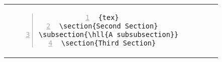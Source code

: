 \begin{table}[h!]
\begin{tabular}{c | c}
\begin{minipage}[m]{0.55\textwidth}
\begin{lstlisting}[numberstyle=\zebra{green!15}{yellow!15},numbers=left,basicstyle=\ttfamily\scriptsize]{tex}
\section{Second Section}
\subsection{\hll{A subsubsection}}
\section{Third Section}

\end{lstlisting}
\end{minipage}
\end{tabular}
\end{table}

